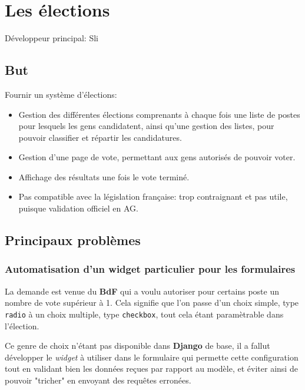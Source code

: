 \documentclass[a4paper]{report}
\begin{document}
\chapter{Les élections}
\label{sec:les_elections}
\par Développeur principal: Sli

\section{But}
\label{sub:but}
\par Fournir un système d'élections:
\begin{itemize}
    \item Gestion des différentes élections comprenants à chaque fois une liste de postes pour lesquels les gens
        candidatent, ainsi qu'une gestion des listes, pour pouvoir classifier et répartir les candidatures.
    \item Gestion d'une page de vote, permettant aux gens autorisés de pouvoir voter.
    \item Affichage des résultats une fois le vote terminé.
    \item Pas compatible avec la législation française: trop contraignant et pas utile, puisque validation officiel en
        AG.
\end{itemize}

\section{Principaux problèmes}
\label{sec:principaux_problemes}

\subsection{Automatisation d'un widget particulier pour les formulaires}
\label{sub:automatisation_d_un_widget_particulier_pour_les_formulaires}
\par La demande est venue du \textbf{BdF} qui a voulu autoriser pour certains poste un nombre de vote supérieur à 1.
Cela signifie que l'on passe d'un choix simple, type \verb#radio# à un choix multiple, type \verb#checkbox#, tout cela
étant paramètrable dans l'élection.

\par Ce genre de choix n'étant pas disponible dans \textbf{Django} de base, il a fallut développer le \emph{widget} à
utiliser dans le formulaire qui permette cette configuration tout en validant bien les données reçues par rapport au
modèle, et éviter ainsi de pouvoir "tricher" en envoyant des requêtes erronées.
\end{document}
